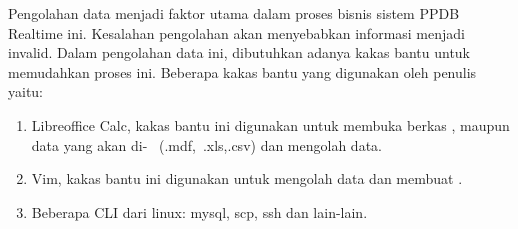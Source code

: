 Pengolahan data menjadi faktor utama dalam proses bisnis sistem PPDB Realtime
ini. Kesalahan pengolahan akan menyebabkan informasi menjadi invalid. Dalam
pengolahan data ini, dibutuhkan adanya kakas bantu untuk memudahkan proses ini.
Beberapa kakas bantu yang digunakan oleh penulis yaitu:

\begin{enumerate} 
  \item Libreoffice Calc, kakas bantu ini digunakan untuk membuka berkas \master,
    maupun data yang akan di- \database~(.mdf,~.xls,.csv) dan mengolah 
    data.
  \item Vim, kakas bantu ini digunakan untuk mengolah data dan membuat \script.
  \item Beberapa CLI dari linux: mysql, scp, ssh dan lain-lain.
\end{enumerate}


